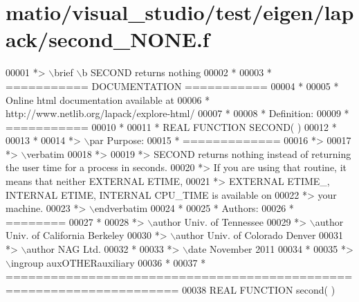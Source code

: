 \hypertarget{matio_2visual__studio_2test_2eigen_2lapack_2second___n_o_n_e_8f_source}{}\section{matio/visual\+\_\+studio/test/eigen/lapack/second\+\_\+\+N\+O\+NE.f}
\label{matio_2visual__studio_2test_2eigen_2lapack_2second___n_o_n_e_8f_source}

\begin{DoxyCode}
00001 \textcolor{comment}{*> \(\backslash\)brief \(\backslash\)b SECOND returns nothing}
00002 \textcolor{comment}{*}
00003 \textcolor{comment}{*  =========== DOCUMENTATION ===========}
00004 \textcolor{comment}{*}
00005 \textcolor{comment}{* Online html documentation available at }
00006 \textcolor{comment}{*            http://www.netlib.org/lapack/explore-html/ }
00007 \textcolor{comment}{*}
00008 \textcolor{comment}{*  Definition:}
00009 \textcolor{comment}{*  ===========}
00010 \textcolor{comment}{*}
00011 \textcolor{comment}{*      REAL FUNCTION SECOND( )}
00012 \textcolor{comment}{*  }
00013 \textcolor{comment}{*}
00014 \textcolor{comment}{*> \(\backslash\)par Purpose:}
00015 \textcolor{comment}{*  =============}
00016 \textcolor{comment}{*>}
00017 \textcolor{comment}{*> \(\backslash\)verbatim}
00018 \textcolor{comment}{*>}
00019 \textcolor{comment}{*>  SECOND returns nothing instead of returning the user time for a process in seconds.}
00020 \textcolor{comment}{*>  If you are using that routine, it means that neither EXTERNAL ETIME,}
00021 \textcolor{comment}{*>  EXTERNAL ETIME\_, INTERNAL ETIME, INTERNAL CPU\_TIME is available  on}
00022 \textcolor{comment}{*>  your machine.}
00023 \textcolor{comment}{*> \(\backslash\)endverbatim}
00024 \textcolor{comment}{*}
00025 \textcolor{comment}{*  Authors:}
00026 \textcolor{comment}{*  ========}
00027 \textcolor{comment}{*}
00028 \textcolor{comment}{*> \(\backslash\)author Univ. of Tennessee }
00029 \textcolor{comment}{*> \(\backslash\)author Univ. of California Berkeley }
00030 \textcolor{comment}{*> \(\backslash\)author Univ. of Colorado Denver }
00031 \textcolor{comment}{*> \(\backslash\)author NAG Ltd. }
00032 \textcolor{comment}{*}
00033 \textcolor{comment}{*> \(\backslash\)date November 2011}
00034 \textcolor{comment}{*}
00035 \textcolor{comment}{*> \(\backslash\)ingroup auxOTHERauxiliary}
00036 \textcolor{comment}{*}
00037 \textcolor{comment}{*  =====================================================================}
00038 \textcolor{keyword}{      REAL }\textcolor{keyword}{FUNCTION }second( )

\end{DoxyCode}
